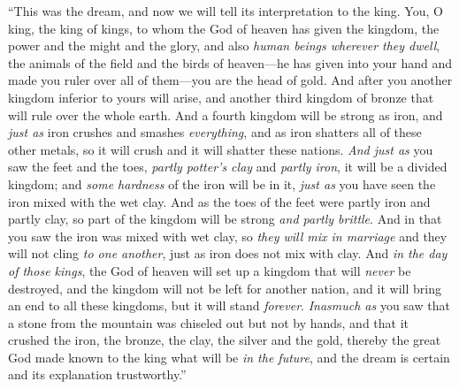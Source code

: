 \begin{biblechapter}
\verse “This was the dream, and now we will tell its interpretation to the king.
\verse You, O king, the king of kings, to whom the God of heaven has given the kingdom, the power and the might and the glory,
\verse and also \textit{human beings wherever they dwell}, the animals of the field and the birds of heaven—he has given into your hand and made you ruler over all of them—you are the head of gold.
\verse And after you another kingdom inferior to yours will arise, and another third kingdom of bronze that will rule over the whole earth.
\verse And a fourth kingdom will be strong as iron, and \textit{just as} iron crushes and smashes \textit{everything}, and as iron shatters all of these other metals, so it will crush and it will shatter these nations.
\verse \textit{And just as} you saw the feet and the toes, \textit{partly potter’s clay} and \textit{partly iron}, it will be a divided kingdom; and \textit{some hardness} of the iron will be in it, \textit{just as} you have seen the iron mixed with the wet clay.
\verse And as the toes of the feet were partly iron and partly clay, so part of the kingdom will be strong \textit{and partly brittle}.
\verse And in that you saw the iron was mixed with wet clay, so \textit{they will mix in marriage} and they will not cling \textit{to one another}, just as iron does not mix with clay.
\verse And \textit{in the day of those kings}, the God of heaven will set up a kingdom that will \textit{never} be destroyed, and the kingdom will not be left for another nation, and it will bring an end to all these kingdoms, but it will stand \textit{forever}.
\verse \textit{Inasmuch as} you saw that a stone from the mountain was chiseled out but not by hands, and that it crushed the iron, the bronze, the clay, the silver and the gold, thereby the great God made known to the king what will be \textit{in the future}, and the dream is certain and its explanation trustworthy.”

\end{biblechapter}
